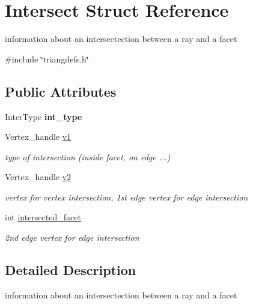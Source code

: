 \hypertarget{structIntersect}{
\section{Intersect Struct Reference}
\label{structIntersect}
}


information about an intersectection between a ray and a facet  




{\ttfamily \#include \char`\"{}triangdefs.h\char`\"{}}

\subsection*{Public Attributes}
\begin{DoxyCompactItemize}
\item 
\hypertarget{structIntersect_a8255815733b4e1b3721b8bc29832bdbc}{
InterType {\bfseries int\_\-type}}
\label{structIntersect_a8255815733b4e1b3721b8bc29832bdbc}

\item 
Vertex\_\-handle \hyperlink{structIntersect_ac475cd53466b32a3b4a96611bb6be216}{v1}
\begin{DoxyCompactList}\small\item\em type of intersection (inside facet, on edge ...) \item\end{DoxyCompactList}\item 
Vertex\_\-handle \hyperlink{structIntersect_ae44020d73365a60da831bfa222703e4e}{v2}
\begin{DoxyCompactList}\small\item\em vertex for vertex intersection, 1st edge vertex for edge intersection \item\end{DoxyCompactList}\item 
int \hyperlink{structIntersect_ae7d78402b79c68e9110144201a7403a6}{intersected\_\-facet}
\begin{DoxyCompactList}\small\item\em 2nd edge vertex for edge intersection \item\end{DoxyCompactList}\end{DoxyCompactItemize}


\subsection{Detailed Description}
information about an intersectection between a ray and a facet 

